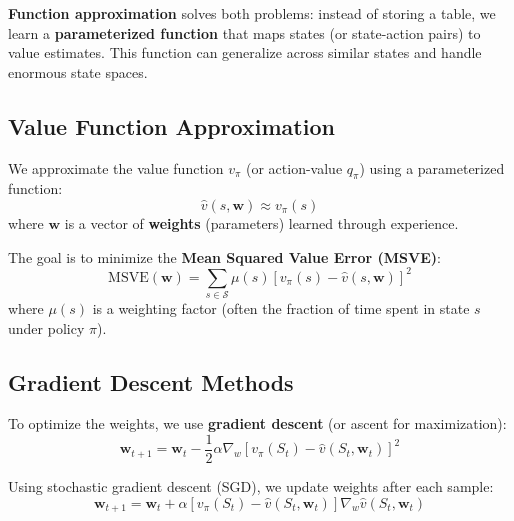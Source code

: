 \documentclass[11pt,a4paper]{article}
\begin{document}
\textbf{Function approximation} solves both problems: instead of storing a table, we learn a \textbf{parameterized function} that maps states (or state-action pairs) to value estimates. This function can generalize across similar states and handle enormous state spaces.

\subsection{Value Function Approximation}

We approximate the value function $v_\pi$ (or action-value $q_\pi$) using a parameterized function:
\[
\hat{v}(s, \mathbf{w}) \approx v_\pi(s)
\]
where $\mathbf{w}$ is a vector of \textbf{weights} (parameters) learned through experience.

The goal is to minimize the \textbf{Mean Squared Value Error (MSVE)}:
\[
\text{MSVE}(\mathbf{w}) = \sum_{s \in \mathcal{S}} \mu(s) [v_\pi(s) - \hat{v}(s, \mathbf{w})]^2
\]
where $\mu(s)$ is a weighting factor (often the fraction of time spent in state $s$ under policy $\pi$).

\subsection{Gradient Descent Methods}

To optimize the weights, we use \textbf{gradient descent} (or ascent for maximization):
\[
\mathbf{w}_{t+1} = \mathbf{w}_t - \frac{1}{2} \alpha \nabla_w [v_\pi(S_t) - \hat{v}(S_t, \mathbf{w}_t)]^2
\]

Using stochastic gradient descent (SGD), we update weights after each sample:
\[
\mathbf{w}_{t+1} = \mathbf{w}_t + \alpha [v_\pi(S_t) - \hat{v}(S_t, \mathbf{w}_t)] \nabla_w \hat{v}(S_t, \mathbf{w}_t)
\]
\end{document}
